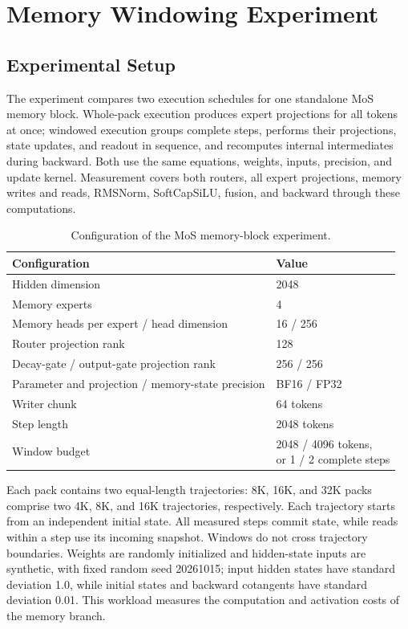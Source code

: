 \section{Memory Windowing Experiment}
\label{appendix:infra_experiment_details}

\subsection{Experimental Setup}

The experiment compares two execution schedules for one standalone MoS memory block.
Whole-pack execution produces expert projections for all tokens at once; windowed execution groups complete steps, performs their projections, state updates, and readout in sequence, and recomputes internal intermediates during backward.
Both use the same equations, weights, inputs, precision, and update kernel.
Measurement covers both routers, all expert projections, memory writes and reads, RMSNorm, SoftCapSiLU, fusion, and backward through these computations.

\begin{table}[htbp]
    \centering
    \caption{Configuration of the MoS memory-block experiment.}
    \label{tab:infra_window_configuration}
    \small
    \renewcommand{\arraystretch}{1.12}
    \begin{tabular}{ll}
        \toprule
        Configuration & Value \\
        \midrule
        Hidden dimension & 2048 \\
        Memory experts & 4 \\
        Memory heads per expert / head dimension & 16 / 256 \\
        Router projection rank & 128 \\
        Decay-gate / output-gate projection rank & 256 / 256 \\
        Parameter and projection / memory-state precision & BF16 / FP32 \\
        Writer chunk & 64 tokens \\
        Step length & 2048 tokens \\
        Window budget & \makecell[l]{2048 / 4096 tokens,\\or 1 / 2 complete steps} \\
        \bottomrule
    \end{tabular}
\end{table}

Each pack contains two equal-length trajectories: 8K, 16K, and 32K packs comprise two 4K, 8K, and 16K trajectories, respectively.
Each trajectory starts from an independent initial state.
All measured steps commit state, while reads within a step use its incoming snapshot.
Windows do not cross trajectory boundaries.
Weights are randomly initialized and hidden-state inputs are synthetic, with fixed random seed 20261015; input hidden states have standard deviation 1.0, while initial states and backward cotangents have standard deviation 0.01.
This workload measures the computation and activation costs of the memory branch.

